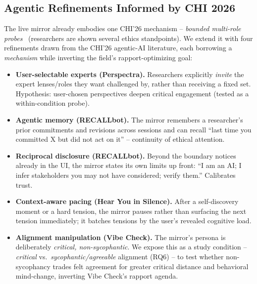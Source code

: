 \documentclass[manuscript,screen]{acmart}
\begin{document}
\subsection{Agentic Refinements Informed by CHI 2026}
The live mirror already embodies one CHI'26 mechanism -- \emph{bounded multi-role
probes}~\citep{perspectra26} (researchers are shown several ethics standpoints). We
extend it with four refinements drawn from the CHI'26 agentic-AI literature, each
borrowing a \emph{mechanism} while inverting the field's rapport-optimizing goal:
\begin{itemize}
  \item \textbf{User-selectable experts (Perspectra).} Researchers explicitly
    \emph{invite} the expert lenses/roles they want challenged by, rather than
    receiving a fixed set. Hypothesis: user-chosen perspectives deepen critical
    engagement (tested as a within-condition probe).
  \item \textbf{Agentic memory (RECALLbot).} The mirror remembers a researcher's
    prior commitments and revisions across sessions and can recall ``last time you
    committed X but did not act on it'' -- continuity of ethical attention.
  \item \textbf{Reciprocal disclosure (RECALLbot).} Beyond the boundary notices
    already in the UI, the mirror states its own limits up front: ``I am an AI; I
    infer stakeholders you may not have considered; verify them.'' Calibrates trust.
  \item \textbf{Context-aware pacing (Hear You in Silence).} After a self-discovery
    moment or a hard tension, the mirror pauses rather than surfacing the next
    tension immediately; it batches tensions by the user's revealed cognitive load.
  \item \textbf{Alignment manipulation (Vibe Check).} The mirror's persona is
    deliberately \emph{critical, non-sycophantic}. We expose this as a study
    condition -- \emph{critical} vs.\ \emph{sycophantic/agreeable} alignment (RQ6) --
    to test whether non-sycophancy trades felt agreement for greater critical
    distance and behavioral mind-change, inverting Vibe Check's rapport agenda.
\end{itemize}

\end{document}
